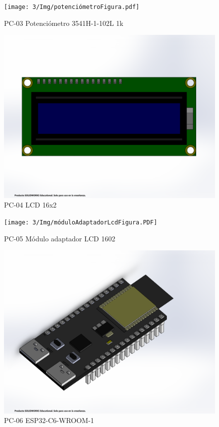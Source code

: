     \begin{figure}[H]
        \centering
        \texttt{[image: 3/Img/potenciómetroFigura.pdf]}
        \caption{PC-03 Potenciómetro 3541H-1-102L 1k}
        \label{fig:potenciómetroFigura}
    \end{figure}
    \begin{figure}[H]
        \centering
        \includegraphics[trim = {1mm 20mm 1mm 20mm},clip,scale=0.2]{3/Img/lcdFigura.pdf}
        \caption{PC-04 LCD 16x2}
        \label{fig:lcdFigura}
    \end{figure}
    \begin{figure}[H]
        \centering
        \texttt{[image: 3/Img/móduloAdaptadorLcdFigura.PDF]}
        \caption{PC-05 Módulo adaptador LCD 1602}
        \label{fig:móduloAdaptadorLcdFigura}
    \end{figure}
    \begin{figure}[H]
        \centering
        \includegraphics[trim = {1mm 10mm 20mm 1mm},clip,scale=0.2]{3/Img/esp32Figura.PDF}
        \caption{PC-06 ESP32-C6-WROOM-1}
        \label{fig:esp32Figura}
    \end{figure}
